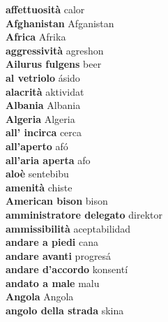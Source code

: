 \textbf{ affettuosità  } calor \\
\textbf{ Afghanistan  } Afganistan \\
\textbf{ Africa  } Afrika \\
\textbf{ aggressività  } agreshon \\
\textbf{ Ailurus fulgens  } beer \\
\textbf{ al vetriolo  } ásido \\
\textbf{ alacrità  } aktividat \\
\textbf{ Albania  } Albania \\
\textbf{ Algeria  } Algeria \\
\textbf{ all’ incirca  } cerca \\
\textbf{ all’aperto  } afó \\
\textbf{ all’aria aperta  } afo \\
\textbf{ aloè  } sentebibu \\
\textbf{ amenità  } chiste \\
\textbf{ American bison  } bison \\
\textbf{ amministratore delegato  } direktor \\
\textbf{ ammissibilità  } aceptabilidad \\
\textbf{ andare a piedi  } cana \\
\textbf{ andare avanti  } progresá \\
\textbf{ andare d’accordo  } konsentí \\
\textbf{ andato a male  } malu \\
\textbf{ Angola  } Angola \\
\textbf{ angolo della strada  } skina \\
